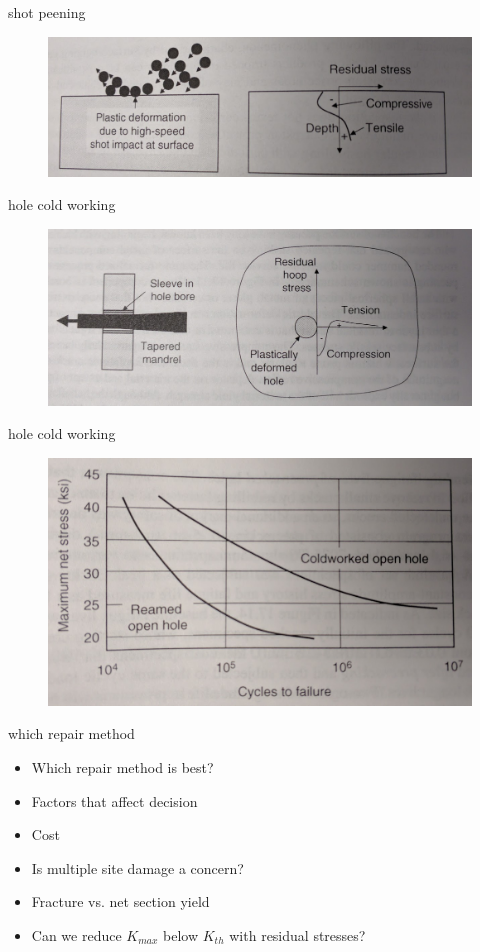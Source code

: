 \documentclass[10pt]{beamer}
\begin{document}
	\begin{frame}{shot peening}
		\begin{figure}
		\centering
		\includegraphics[width=0.7\linewidth]{"../Figures/shot-peening"}
		\end{figure}
	\end{frame}
	
	\begin{frame}{hole cold working}
		\begin{figure}
		\centering
		\includegraphics[width=0.7\linewidth]{../Figures/hole-cold-working}
		\end{figure}
	\end{frame}
	
	\begin{frame}{hole cold working}
		\begin{figure}
		\centering
		\includegraphics[width=0.7\linewidth]{../Figures/hole-SN}
		\end{figure}
	\end{frame}
	
	\begin{frame}{which repair method}
		\begin{itemize}[<+->]
			\item Which repair method is best?
			\item Factors that affect decision
			\item Cost
			\item Is multiple site damage a concern?
			\item Fracture vs. net section yield
			\item Can we reduce $K_{max}$ below $K_{th}$ with residual stresses?
		\end{itemize}
	\end{frame}
	
\end{document}
